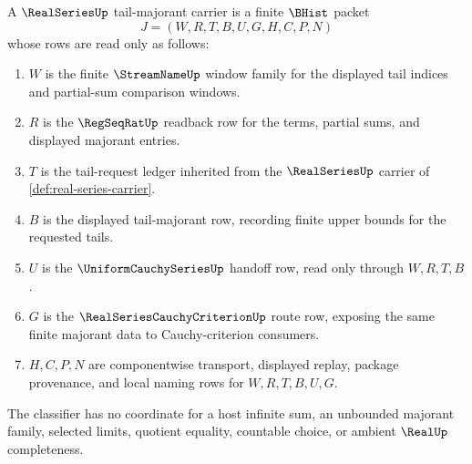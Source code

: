 \begin{definition}
\label{def:realseries-tail-majorant-carrier}
A $\RealSeriesUp$ tail-majorant carrier is a finite $\BHist$ packet
$$
J=(W,R,T,B,U,G,H,C,P,N)
$$
whose rows are read only as follows:
\begin{enumerate}
\item $W$ is the finite $\StreamNameUp$ window family for the displayed tail indices and partial-sum comparison windows.
\item $R$ is the $\RegSeqRatUp$ readback row for the terms, partial sums, and displayed majorant entries.
\item $T$ is the tail-request ledger inherited from the $\RealSeriesUp$ carrier of \autoref{def:real-series-carrier}.
\item $B$ is the displayed tail-majorant row, recording finite upper bounds for the requested tails.
\item $U$ is the $\UniformCauchySeriesUp$ handoff row, read only through $W,R,T,B$.
\item $G$ is the $\RealSeriesCauchyCriterionUp$ route row, exposing the same finite majorant data to Cauchy-criterion consumers.
\item $H,C,P,N$ are componentwise transport, displayed replay, package provenance, and local naming rows for $W,R,T,B,U,G$.
\end{enumerate}
The classifier has no coordinate for a host infinite sum, an unbounded majorant family, selected limits, quotient equality, countable choice, or ambient $\RealUp$ completeness.
\end{definition}

